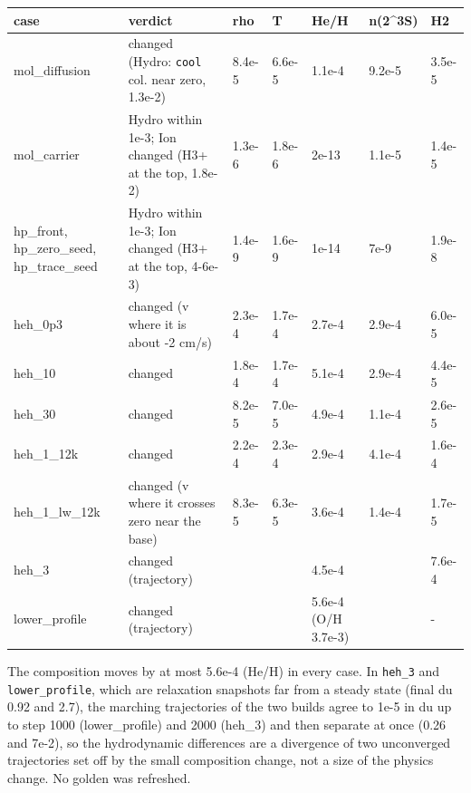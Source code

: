 \documentclass[english,a4paper]{my_memo}
\begin{document}
{\def\LTcaptype{none} %
{\small
\begin{longtable}[]{@{}>{\raggedright\arraybackslash}p{\dimexpr(\linewidth-14\tabcolsep)/7\relax}>{\raggedright\arraybackslash}p{\dimexpr(\linewidth-14\tabcolsep)/7\relax}>{\raggedright\arraybackslash}p{\dimexpr(\linewidth-14\tabcolsep)/7\relax}>{\raggedright\arraybackslash}p{\dimexpr(\linewidth-14\tabcolsep)/7\relax}>{\raggedright\arraybackslash}p{\dimexpr(\linewidth-14\tabcolsep)/7\relax}>{\raggedright\arraybackslash}p{\dimexpr(\linewidth-14\tabcolsep)/7\relax}>{\raggedright\arraybackslash}p{\dimexpr(\linewidth-14\tabcolsep)/7\relax}@{}}
\toprule\noalign{}
case & verdict & rho & T & He/H & n(2\^{}3S) & H2 \\
\midrule\noalign{}
\endhead
\bottomrule\noalign{}
\endlastfoot
mol\_diffusion & changed (Hydro: \texttt{cool} col. near zero, 1.3e-2) & 8.4e-5 & 6.6e-5 & 1.1e-4 & 9.2e-5 & 3.5e-5 \\
mol\_carrier & Hydro within 1e-3; Ion changed (H3+ at the top, 1.8e-2) & 1.3e-6 & 1.8e-6 & 2e-13 & 1.1e-5 & 1.4e-5 \\
hp\_front, hp\_zero\_seed, hp\_trace\_seed & Hydro within 1e-3; Ion changed (H3+ at the top, 4-6e-3) & 1.4e-9 & 1.6e-9 & 1e-14 & 7e-9 & 1.9e-8 \\
heh\_0p3 & changed (v where it is about -2 cm/s) & 2.3e-4 & 1.7e-4 & 2.7e-4 & 2.9e-4 & 6.0e-5 \\
heh\_10 & changed & 1.8e-4 & 1.7e-4 & 5.1e-4 & 2.9e-4 & 4.4e-5 \\
heh\_30 & changed & 8.2e-5 & 7.0e-5 & 4.9e-4 & 1.1e-4 & 2.6e-5 \\
heh\_1\_12k & changed & 2.2e-4 & 2.3e-4 & 2.9e-4 & 4.1e-4 & 1.6e-4 \\
heh\_1\_lw\_12k & changed (v where it crosses zero near the base) & 8.3e-5 & 6.3e-5 & 3.6e-4 & 1.4e-4 & 1.7e-5 \\
heh\_3 & changed (trajectory) & 0.18 & 0.14 & 4.5e-4 & 0.16 & 7.6e-4 \\
lower\_profile & changed (trajectory) & 0.47 & 0.33 & 5.6e-4 (O/H 3.7e-3) & 0.32 & - \\
\end{longtable}
}
}

The composition moves by at most 5.6e-4 (He/H) in every case. In
\texttt{heh\_3} and \texttt{lower\_profile}, which are relaxation snapshots far from a
steady state (final du 0.92 and 2.7), the marching trajectories of the two
builds agree to 1e-5 in du up to step 1000 (lower\_profile) and 2000 (heh\_3)
and then separate at once (0.26 and 7e-2), so the hydrodynamic differences
are a divergence of two unconverged trajectories set off by the small
composition change, not a size of the physics change. No golden was
refreshed.
\end{document}
